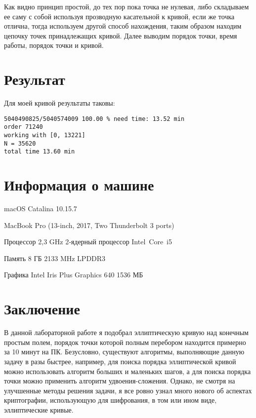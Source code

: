 Как видно принцип простой, до тех пор пока точка не нулевая, либо складываем ее саму с собой используя прозводную касательной к кривой, если же точка отлична, тогда используем другой способ нахождения, таким образом находим цепочку точек принадлежащих кривой. Далее выводим порядок точки, время работы, порядок точки и кривой.

\section{Результат}

Для моей кривой результаты таковы:

\begin{lstlisting}
5040490825/5040574009 100.00 % need time: 13.52 min
order 71240
working with [0, 13221]
N = 35620
total time 13.60 min
\end{lstlisting}

\section{Информация о машине}

macOS Catalina 10.15.7

MacBook Pro (13-inch, 2017, Two Thunderbolt 3 ports)

Процессор 2,3 GHz 2‑ядерный процессор Intel Core i5

Память 8 ГБ 2133 MHz LPDDR3

Графика Intel Iris Plus Graphics 640 1536 МБ

\section{Заключение}

В данной лабораторной работе я подобрал эллиптическую кривую над конечным простым полем, порядок точки которой полным перебором находится примерно за 10 минут на ПК. Безусловно, существуют алгоритмы, выполняющие данную задачу в разы быстрее, например, для поиска порядка эллиптической кривой можно использовать алгоритм больших и маленьких шагов, а для поиска порядка точки можно применить алгоритм удвоения-сложения. Однако, не смотря на улучшенные методы решения задачи, я все ровно узнал много нового об аспектах криптографии, использующую для шифрования, в том или ином виде, эллиптические кривые. 







